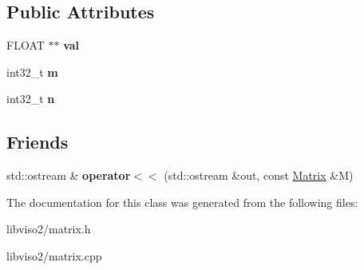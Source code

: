 \subsection*{Public Attributes}
\begin{DoxyCompactItemize}
\item 
\hypertarget{class_matrix_ae2a7d4612c034e528c74b9357dcc55b3}{F\+L\+O\+A\+T $\ast$$\ast$ {\bfseries val}}\label{class_matrix_ae2a7d4612c034e528c74b9357dcc55b3}

\item 
\hypertarget{class_matrix_a36f64de7d42d79e975cbd1f1dec6c02b}{int32\+\_\+t {\bfseries m}}\label{class_matrix_a36f64de7d42d79e975cbd1f1dec6c02b}

\item 
\hypertarget{class_matrix_a8cfdf16f7777b567a88d5e6484cbeaef}{int32\+\_\+t {\bfseries n}}\label{class_matrix_a8cfdf16f7777b567a88d5e6484cbeaef}

\end{DoxyCompactItemize}
\subsection*{Friends}
\begin{DoxyCompactItemize}
\item 
\hypertarget{class_matrix_a417f38420c2a6ae657cb9a91e2fd7037}{std\+::ostream \& {\bfseries operator$<$$<$} (std\+::ostream \&out, const \hyperlink{class_matrix}{Matrix} \&M)}\label{class_matrix_a417f38420c2a6ae657cb9a91e2fd7037}

\end{DoxyCompactItemize}


The documentation for this class was generated from the following files\+:\begin{DoxyCompactItemize}
\item 
libviso2/matrix.\+h\item 
libviso2/matrix.\+cpp\end{DoxyCompactItemize}
